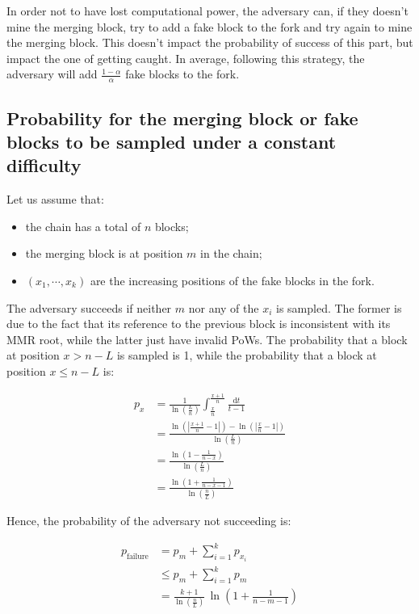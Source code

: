        In order not to have lost computational power, the adversary can, if they doesn't mine the merging block, try to add a fake block to the fork and try again to mine the merging block. This doesn't impact the probability of success of this part, but impact the one of getting caught. In average, following this strategy, the adversary will add \(\frac{1-\alpha}{\alpha}\) fake blocks to the fork.
      \subsection{Probability for the merging block or fake blocks to be sampled under a constant difficulty}
        Let us assume that:
        \begin{itemize}
          \item the chain has a total of \(n\) blocks;
          \item the merging block is at position \(m\) in the chain;
          \item \((x_1,\cdots,x_k)\) are the increasing positions of the fake blocks in the fork.
        \end{itemize}
        
        The adversary succeeds if neither \(m\) nor any of the \(x_i\) is sampled. The former is due to the fact that its reference to the previous block is inconsistent with its MMR root, while the latter just have invalid PoWs. The probability that a block at position \(x>n - L\) is sampled is 1, while the probability that a block at position \(x\leqslant n-L\) is:
        
        \begin{align*}
          p_x &= \frac{1}{\ln\left(\frac{L}{n}\right)}\int_{\frac{x}{n}}^{\frac{x+1}{n}}\frac{\mathrm{d}t}{t-1}\\
          &= \frac{\ln\left(\left|\frac{x+1}{n}-1\right|\right)-\ln\left(\left|\frac{x}{n}-1\right|\right)}{\ln\left(\frac{L}{n}\right)}\\
          &= \frac{\ln\left(1-\frac{1}{n-x}\right)}{\ln\left(\frac{L}{n}\right)}\\
          &= \frac{\ln\left(1+\frac{1}{n-x-1}\right)}{\ln\left(\frac{n}{L}\right)}
        \end{align*}
        
        Hence, the probability of the adversary not succeeding is:
        
        \begin{align*}
          p_{\text{failure}} &= p_m + \sum_{i=1}^kp_{x_i}\\
          &\leqslant p_m + \sum_{i=1}^kp_m\\
          &= \frac{k+1}{\ln\left(\frac{n}{L}\right)}\,\ln\left(1+\frac{1}{n-m-1}\right)
        \end{align*}
        
